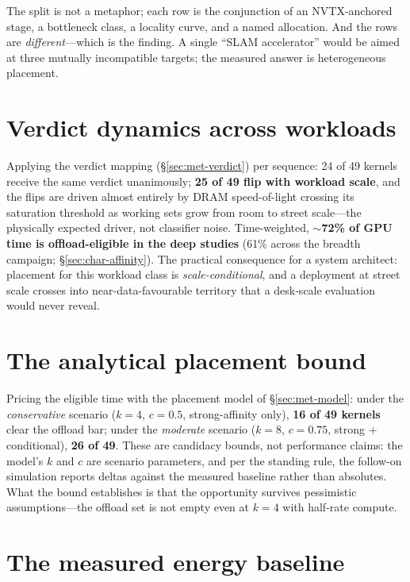 The split is not a metaphor; each row is the conjunction of an NVTX-anchored
stage, a bottleneck class, a locality curve, and a named allocation. And the
rows are \emph{different}---which is the finding. A single ``SLAM
accelerator'' would be aimed at three mutually incompatible targets; the
measured answer is heterogeneous placement.

\section{Verdict dynamics across workloads}
\label{sec:syn-dynamics}

Applying the verdict mapping (\S\ref{sec:met-verdict}) per sequence: 24 of
49 kernels receive the same verdict unanimously; \textbf{25 of 49 flip with
workload scale}, and the flips are driven almost entirely by DRAM
speed-of-light crossing its saturation threshold as working sets grow from
room to street scale---the physically expected driver, not classifier
noise. Time-weighted, \textbf{$\sim$72\% of GPU time is offload-eligible in
the deep studies} (61\% across the breadth campaign;
\S\ref{sec:char-affinity}). The practical consequence for a system
architect: placement for this workload class is \emph{scale-conditional},
and a deployment at street scale crosses into near-data-favourable
territory that a desk-scale evaluation would never reveal.

\section{The analytical placement bound}
\label{sec:syn-model}

Pricing the eligible time with the placement model of \S\ref{sec:met-model}:
under the \emph{conservative} scenario ($k{=}4$, $c{=}0.5$, strong-affinity
only), \textbf{16 of 49 kernels} clear the offload bar; under the
\emph{moderate} scenario ($k{=}8$, $c{=}0.75$, strong + conditional),
\textbf{26 of 49}. These are candidacy bounds, not performance claims: the
model's $k$ and $c$ are scenario parameters, and per the standing rule, the
follow-on simulation reports deltas against the measured baseline rather
than absolutes. What the bound establishes is that the opportunity survives
pessimistic assumptions---the offload set is not empty even at $k{=}4$ with
half-rate compute.

\section{The measured energy baseline}
\label{sec:syn-energy}


